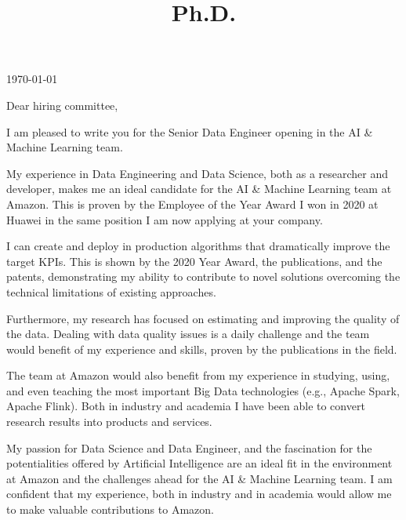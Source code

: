 \documentclass[11pt,a4paper,colorlinks,linkcolor=true]{moderncv}
\title{Ph.D.}
\newcommand{\positionname}{Senior Data Engineer}
\newcommand{\teamname}{AI \& Machine Learning}
\newcommand{\companyname}{Amazon}
\begin{document}
\hypersetup{urlcolor=color1}

\makecvtitle
\pagestyle{empty} %

\begin{flushright}
\mydate
\today
\end{flushright}

\vspace*{5mm}

Dear hiring committee,

\vspace*{5mm}

I am pleased to write you for the \positionname{} opening in the \teamname{} team.

\vspace*{3mm}

My experience in Data Engineering and Data Science, both as a researcher and developer, makes me an ideal candidate for the \teamname{} team at \companyname{}. This is proven by the Employee of the Year Award I won in 2020 at Huawei in the same position I am now applying at your company.

\vspace*{3mm}

I can create and deploy in production algorithms that dramatically improve the target KPIs. This is shown by the 2020 Year Award, the publications, and the patents, demonstrating my ability to contribute to novel solutions overcoming the technical limitations of existing approaches.

\vspace*{3mm}

Furthermore, my research has focused on estimating and improving the quality of the data. Dealing with data quality issues is a daily challenge and the team would benefit of my experience and skills, proven by the publications in the field.

\vspace*{3mm}

The team at \companyname{} would also benefit from my experience in studying, using, and even teaching the most important Big Data technologies (e.g., Apache Spark, Apache Flink). Both in industry and academia I have been able to convert research results into products and services.

\vspace*{3mm}

My passion for Data Science and Data Engineer, and the fascination for the potentialities offered by Artificial Intelligence are an ideal fit in the environment at \companyname{} and the challenges ahead for the \teamname{} team. I am confident that my experience, both in industry and in academia would allow me to make valuable contributions to \companyname{}.
\end{document}
